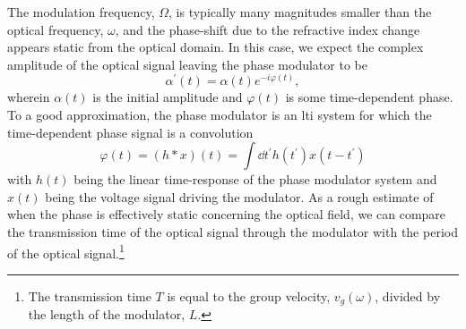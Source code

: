 The modulation frequency, $\Omega$, is typically many magnitudes smaller than the optical frequency, $\omega$, and the phase-shift due to the refractive index change appears static from the optical domain.
In this case, we expect the complex amplitude of the optical signal leaving the phase modulator to be
\begin{equation}
	\alpha^\prime(t)
	=
	\alpha(t)
	e^{-i\varphi(t)}
	\label{eq:phase_modulation}
	,
\end{equation}
wherein $\alpha(t)$ is the initial amplitude and $\varphi(t)$ is some time-dependent phase.
To a good approximation, the phase modulator is an \gls{lti} system for which the time-dependent phase signal is a convolution
\begin{equation}
	\varphi(t)
	=
	\left(h*x\right)(t)
	=
	\int\dd{t^\prime}
	h(t^\prime)
	x(t-t^\prime)
\end{equation}
with $h(t)$ being the linear time-response of the phase modulator system and $x(t)$ being the voltage signal driving the modulator.
As a rough estimate of when the phase is effectively static concerning the optical field, we can compare the transmission time of the optical signal through the modulator with the period of the optical signal.\footnote{The transmission time $T$ is equal to the group velocity, $v_g(\omega)$, divided by the length of the modulator, $L$.}


